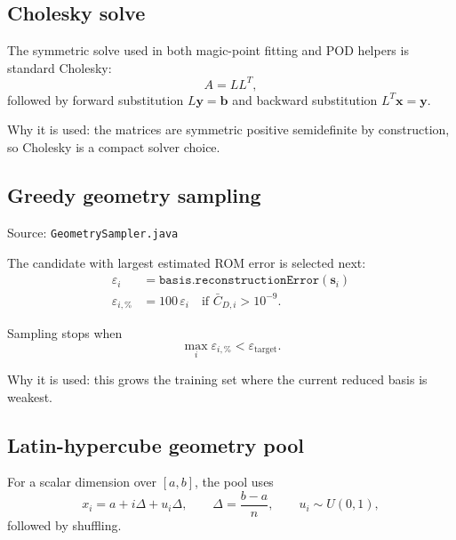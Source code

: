 \documentclass[11pt]{article}
\begin{document}
\subsection{Cholesky solve}
The symmetric solve used in both magic-point fitting and POD helpers is standard Cholesky:
\begin{equation*}
A = LL^T,
\end{equation*}
followed by forward substitution $L\mathbf y=\mathbf b$ and backward substitution $L^T\mathbf x=\mathbf y$.

Why it is used: the matrices are symmetric positive semidefinite by construction, so Cholesky is a compact solver choice.

\subsection{Greedy geometry sampling}
Source: \texttt{GeometrySampler.java}

The candidate with largest estimated ROM error is selected next:
\begin{align*}
\varepsilon_i &= \texttt{basis.reconstructionError}(\mathbf s_i) \\
\varepsilon_{i,\%} &= 100\,\varepsilon_i \quad \text{if } \bar C_{D,i} > 10^{-9}.
\end{align*}

Sampling stops when
\begin{equation*}
\max_i \varepsilon_{i,\%} < \varepsilon_{\mathrm{target}}.
\end{equation*}

Why it is used: this grows the training set where the current reduced basis is weakest.

\subsection{Latin-hypercube geometry pool}
For a scalar dimension over $[a,b]$, the pool uses
\begin{equation*}
x_i = a + i\Delta + u_i\Delta,
\qquad
\Delta = \frac{b-a}{n},
\qquad
u_i \sim U(0,1),
\end{equation*}
followed by shuffling.
\end{document}
